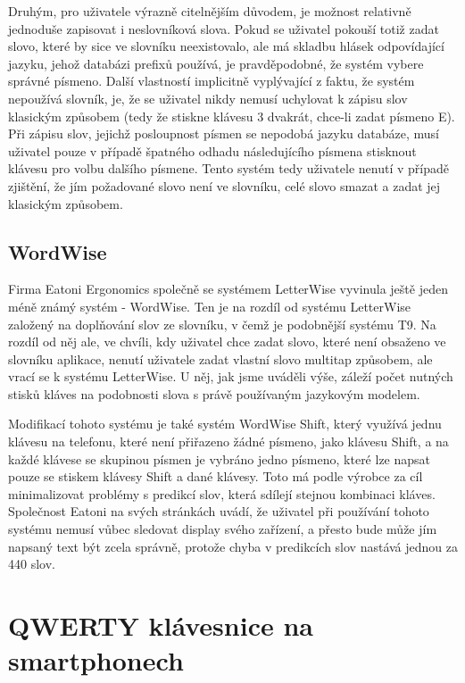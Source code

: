 \documentclass[a4paper,11pt]{article}
\begin{document}
Druhým, pro uživatele výrazně citelnějším důvodem, je možnost relativně jednoduše zapisovat i neslovníková slova. Pokud se uživatel pokouší totiž zadat slovo, které by sice ve slovníku neexistovalo, ale má skladbu hlásek odpovídající jazyku, jehož databázi prefixů používá, je pravděpodobné, že systém vybere správné písmeno. Další vlastností implicitně vyplývající z faktu, že systém nepoužívá slovník, je, že se uživatel nikdy nemusí uchylovat k zápisu slov klasickým způsobem (tedy že stiskne klávesu 3 dvakrát, chce-li zadat písmeno E). Při zápisu slov, jejichž posloupnost písmen se nepodobá jazyku databáze, musí uživatel pouze v případě špatného odhadu následujícího písmena stisknout klávesu pro volbu dalšího písmene. Tento systém tedy uživatele nenutí v případě zjištění, že jím požadované slovo není ve slovníku, celé slovo smazat a zadat jej klasickým způsobem. \cite{MacKenzie2001} \cite{Ghayoomi2009}

\subsection{WordWise}

Firma Eatoni Ergonomics společně se systémem LetterWise vyvinula ještě jeden méně známý systém - WordWise. Ten je na rozdíl od systému LetterWise založený na doplňování slov ze slovníku, v čemž je podobnější systému T9. Na rozdíl od něj ale, ve chvíli, kdy uživatel chce zadat slovo, které není obsaženo ve slovníku aplikace, nenutí uživatele zadat vlastní slovo multitap způsobem, ale vrací se k systému LetterWise. U něj, jak jsme uváděli výše, záleží počet nutných stisků kláves na podobnosti slova s právě používaným jazykovým modelem. 

Modifikací tohoto systému je také systém WordWise Shift, který využívá jednu klávesu na telefonu, které není přiřazeno žádné písmeno, jako klávesu Shift, a na každé klávese se skupinou písmen je vybráno jedno písmeno, které lze napsat pouze se stiskem klávesy Shift a dané klávesy. Toto má podle výrobce za cíl minimalizovat problémy s predikcí slov, která sdílejí stejnou kombinaci kláves. Společnost Eatoni na svých stránkách uvádí, že uživatel při používání tohoto systému nemusí vůbec sledovat display svého zařízení, a přesto bude může jím napsaný text být zcela správně, protože chyba v predikcích slov nastává jednou za 440 slov. \cite{Ward2012} 

\section{QWERTY klávesnice na smartphonech}
\end{document}
